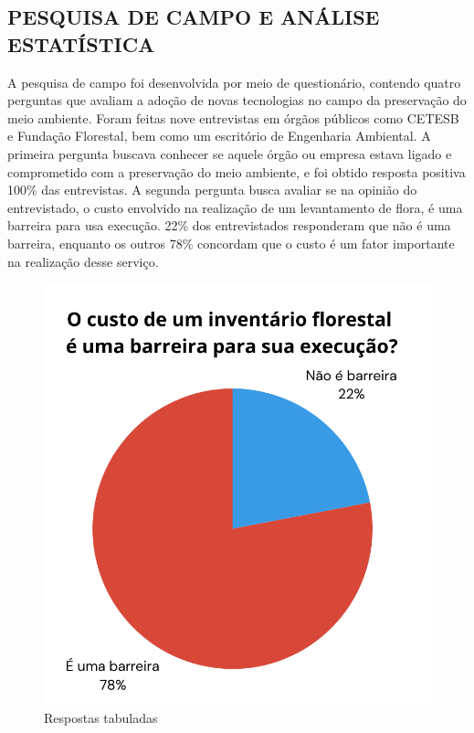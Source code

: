 \subsection*{PESQUISA DE CAMPO E ANÁLISE ESTATÍSTICA}

A pesquisa de campo foi desenvolvida por meio de questionário, contendo quatro perguntas que avaliam a adoção de novas tecnologias no campo da preservação do meio ambiente. Foram feitas nove entrevistas em órgãos públicos como CETESB e Fundação Florestal, bem como um escritório de Engenharia Ambiental.
A primeira pergunta buscava conhecer se aquele órgão ou empresa estava ligado e comprometido com a preservação do meio ambiente, e foi obtido resposta positiva 100\% das entrevistas.
A segunda pergunta busca avaliar se na opinião do entrevistado, o custo envolvido na realização de um levantamento de flora, é uma barreira para usa execução. 22\% dos entrevistados responderam que não é uma barreira, enquanto os outros 78\% concordam que o custo é um fator importante na realização desse serviço.
\begin{figure}[!h]
    \centering
    \caption{Respostas tabuladas}
    \label{Gráfico 1}
    \includegraphics[width=0.5\linewidth]{Illustrations/grph-question2.png}
    \end{figure}

